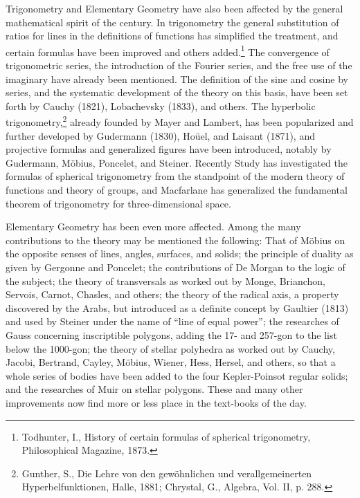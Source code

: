 \documentclass[oneside]{book}
\begin{document}
Trigonometry and Elementary Geometry have also been affected by the
general mathematical spirit of the century. In trigonometry the
general substitution of ratios for lines in the definitions of
functions has simplified the treatment, and certain formulas have
been improved and others added.\footnote{Todhunter, I., History of
certain formulas of spherical trigonometry, Philosophical Magazine,
1873.} The convergence of trigonometric series, the introduction of
the Fourier series, and the free use of the imaginary have already
been mentioned. The definition of the sine and cosine by series, and
the systematic development of the theory on this basis, have been
set forth by Cauchy (1821), Lobachevsky (1833), and others. The
hyperbolic trigonometry,\footnote{Gunther, S., Die Lehre von den
gew\"ohnlichen und verallgemeinerten Hyperbelfunktionen, Halle, 1881;
Chrystal, G., Algebra, Vol. II, p. 288.} already founded by Mayer and
Lambert, has been popularized and further developed by Gudermann
(1830), Ho\"uel, and Laisant (1871), and projective formulas and
generalized figures have been introduced, notably by Gudermann,
M\"obius, Poncelet, and Steiner. Recently Study has investigated the
formulas of spherical trigonometry from the standpoint of the modern
theory of functions and theory of groups, and Macfarlane has
generalized the fundamental theorem of trigonometry for
three-dimensional space.

Elementary Geometry has been even more affected. Among the many
contributions to the theory may be mentioned the following: That of
M\"obius on the opposite senses of lines, angles, surfaces, and
solids; the principle of duality as given by Gergonne and Poncelet;
the contributions of De Morgan to the logic of the subject; the
theory of transversals as worked out by Monge, Brianchon, Servois,
Carnot, Chasles, and others; the theory of the radical axis, a
property discovered by the Arabs, but introduced as a definite
concept by Gaultier (1813) and used by Steiner under the name of
``line of equal power''; the researches of Gauss concerning
inscriptible polygons, adding the 17- and 257-gon to the list below
the 1000-gon; the theory of stellar polyhedra as worked out by
Cauchy, Jacobi, Bertrand, Cayley, M\"obius, Wiener, Hess, Hersel,
and others, so that a whole series of bodies have been added to the
four Kepler-Poinsot regular solids; and the researches of Muir on
stellar polygons. These and many other improvements now find more or
less place in the text-books of the day.
\end{document}
